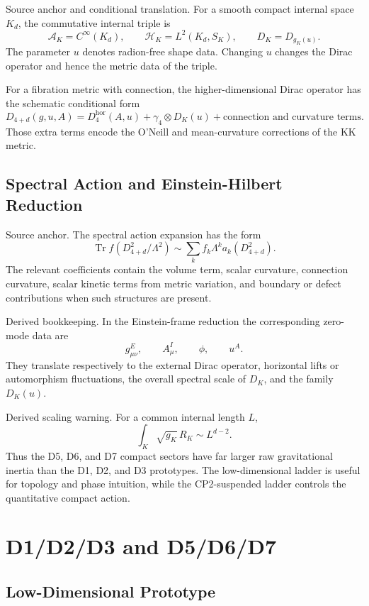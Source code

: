\documentclass[11pt]{article}
\newcommand{\Tr}{\operatorname{Tr}}
\begin{document}
Source anchor and conditional translation.  For a smooth compact internal
space \(K_d\), the commutative internal triple is
\[
  \mathcal A_K=C^\infty(K_d),\qquad
  \mathcal H_K=L^2(K_d,S_K),\qquad
  D_K=D_{g_K(u)}.
\]
The parameter \(u\) denotes radion-free shape data.  Changing \(u\) changes
the Dirac operator and hence the metric data of the triple.

For a fibration metric with connection, the higher-dimensional Dirac
operator has the schematic conditional form
\[
  D_{4+d}(g,u,A)
   =D_4^{\mathrm{hor}}(A,u)
    +\gamma_4\otimes D_K(u)
    +\text{connection and curvature terms}.
\]
Those extra terms encode the O'Neill and mean-curvature corrections of the
KK metric.

\subsection{Spectral Action and Einstein-Hilbert Reduction}

Source anchor.  The spectral action expansion has the form
\[
  \Tr f(D_{4+d}^2/\Lambda^2)
  \sim \sum_k f_k\Lambda^k a_k(D_{4+d}^2).
\]
The relevant coefficients contain the volume term, scalar curvature,
connection curvature, scalar kinetic terms from metric variation, and
boundary or defect contributions when such structures are present.

Derived bookkeeping.  In the Einstein-frame reduction the corresponding
zero-mode data are
\[
  g^E_{\mu\nu},\qquad A^I_\mu,\qquad \phi,\qquad u^A.
\]
They translate respectively to the external Dirac operator, horizontal
lifts or automorphism fluctuations, the overall spectral scale of \(D_K\),
and the family \(D_K(u)\).

Derived scaling warning.  For a common internal length \(L\),
\[
  \int_K \sqrt{g_K}\,R_K \sim L^{d-2}.
\]
Thus the D5, D6, and D7 compact sectors have far larger raw gravitational
inertia than the D1, D2, and D3 prototypes.  The low-dimensional ladder is
useful for topology and phase intuition, while the CP2-suspended ladder
controls the quantitative compact action.

\section{D1/D2/D3 and D5/D6/D7}

\subsection{Low-Dimensional Prototype}
\end{document}
